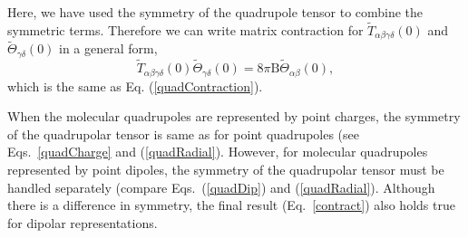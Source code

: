 Here, we have used the symmetry of the quadrupole tensor to combine
the symmetric terms. Therefore we can write matrix contraction for
$\tilde{T}_{\alpha\beta\gamma\delta}(\mathrm{0})$ and
$ \tilde{\Theta}_{\gamma\delta}(\mathrm{0})$ in a general form,
\begin{equation}
\tilde{T}_{\alpha\beta\gamma\delta}(\mathrm{0})\tilde{\Theta}_{\gamma\delta}(\mathrm{0})
= 8 \pi \mathrm{B} \tilde{\Theta}_{\alpha\beta}(\mathrm{0}),
\label{contract}
\end{equation}
which is the same as Eq. (\ref{quadContraction}).

When the molecular quadrupoles are represented by point charges, the
symmetry of the quadrupolar tensor is same as for point quadrupoles
(see Eqs.~\ref{quadCharge} and (\ref{quadRadial}). However, for
molecular quadrupoles represented by point dipoles, the symmetry of
the quadrupolar tensor must be handled separately (compare
Eqs.~(\ref{quadDip}) and (\ref{quadRadial}). Although there is a
difference in symmetry, the final result (Eq.~\ref{contract}) also holds
true for dipolar representations.

